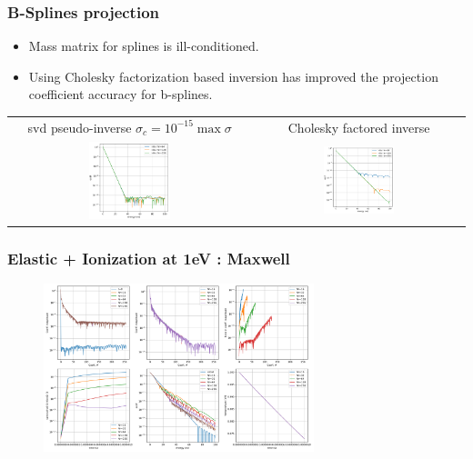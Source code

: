 \documentclass[mathserif, aspectratio=169]{beamer}
\begin{document}
\begin{frame}
	\frametitle{B-Splines projection}
	\begin{itemize}
		\item Mass matrix for splines is ill-conditioned. 
		\item Using Cholesky factorization based inversion has improved the projection coefficient accuracy for b-splines. 
	\end{itemize}
\begin{table}
	\centering
	\begin{tabular}{cc}
		svd pseudo-inverse $\sigma_{c} = 10^{-15}\max\sigma$ &  Cholesky factored inverse \\
		\includegraphics[width=0.35\textwidth]{figures/svd_pseudo_inv.png} &
		\includegraphics[width=0.35\textwidth]{figures/cholesky_inv.png} 
	\end{tabular}
\end{table}
\end{frame}


\begin{frame}
\frametitle{Elastic + Ionization at 1eV : Maxwell}
\begin{figure}
	\centering
	\includegraphics[width=0.7\textwidth]{figures/m_1ev_coeff.png}
\end{figure}
\end{frame}
\end{document}
